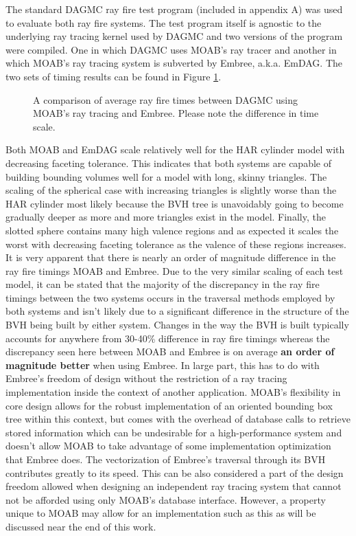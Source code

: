 The standard DAGMC ray fire test program (included in appendix A) was used to
evaluate both ray fire systems. The test program itself is agnostic to the
underlying ray tracing kernel used by DAGMC and two versions of the program were
compiled. One in which DAGMC uses MOAB's ray tracer and another in which MOAB's
ray tracing system is subverted by Embree, a.k.a. EmDAG. The two sets of timing
results can be found in Figure \ref{emdag_timing_compare}.

\begin{figure}[H]
  \vspace{-3cm}
  \centering
  \caption{A comparison of average ray fire times between DAGMC using MOAB's ray
    tracing and Embree. Please note the difference in time scale.}
  \label{emdag_timing_compare}
\end{figure}

Both MOAB and EmDAG scale relatively well for the HAR cylinder model with
decreasing faceting tolerance. This indicates that both systems are capable of
building bounding volumes well for a model with long, skinny triangles. The
scaling of the spherical case with increasing triangles is slightly worse than
the HAR cylinder most likely because the BVH tree is unavoidably going to
become gradually deeper as more and more triangles exist in the model. Finally,
the slotted sphere contains many high valence regions and as expected it scales
the worst with decreasing faceting tolerance as the valence of these regions
increases. It is very apparent that there is nearly an order of magnitude
difference in the ray fire timings MOAB and Embree. Due to the very similar
scaling of each test model, it can be stated that the majority of the
discrepancy in the ray fire timings between the two systems occurs in the
traversal methods employed by both systems and isn't likely due to a significant
difference in the structure of the BVH being built by either system. Changes in
the way the BVH is built typically accounts for anywhere from 30-40\% difference
in ray fire timings whereas the discrepancy seen here between MOAB and Embree is
on average \textbf{an order of magnitude better} when using Embree. In large
part, this has to do with Embree's freedom of design without the restriction of
a ray tracing implementation inside the context of another application. MOAB's
flexibility in core design allows for the robust implementation of an oriented
bounding box tree within this context, but comes with the overhead of database
calls to retrieve stored information which can be undesirable for a
high-performance system and doesn't allow MOAB to take advantage of some
implementation optimization that Embree does. The vectorization of Embree's
traversal through its BVH contributes greatly to its speed. This can be also
considered a part of the design freedom allowed when designing an independent
ray tracing system that cannot not be afforded using only MOAB's database
interface. However, a property unique to MOAB may allow for an implementation
such as this as will be discussed near the end of this work.

